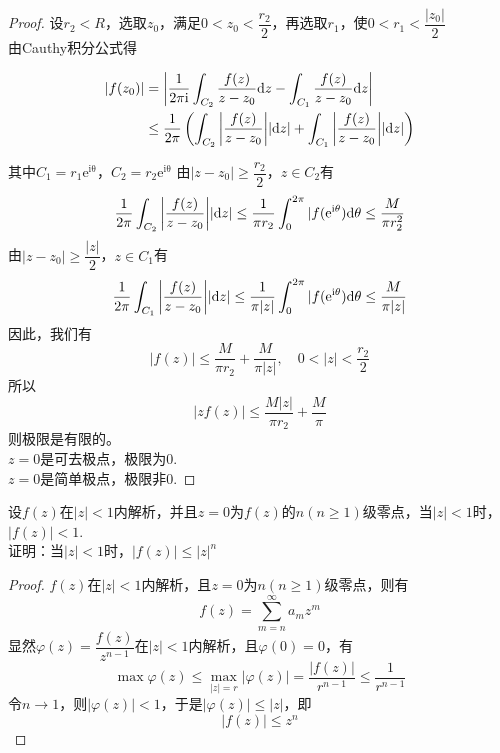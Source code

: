 \begin{proof}
    
    设$r_2 < R$，选取$z_0$，满足$0 < z_0 < \dfrac{r_2}{2}$，再选取$r_1$，使$0 < r_1 < \dfrac{|z_0|}{2}$ \\
    由\textup{Cauthy}积分公式得

    \begin{align*}
        |f(z_0)| & = \left| \dfrac{1}{2\mathrm{\pi i}} \int_{C_2}{\dfrac{f(z)}{z - z_0}}\mathrm{d} z - \int_{C_1}{\dfrac{f(z)}{z - z_0}}\mathrm{d} z \right| \\
        & \leq \dfrac{1}{2 \pi} \left( \int_{C_2}{\left| \dfrac{f(z)}{z - z_0} \right|}|\mathrm{d} z| + \int_{C_1}{\left| \dfrac{f(z)}{z - z_0} \right|}|\mathrm{d} z| \right)
    \end{align*}

    其中$C_1 = r_1\mathrm{e^{i\theta}}$，$C_2 = r_2\mathrm{e^{i\theta}}$
    由$|z - z_0| \geq \dfrac{r_2}{2}$，$z \in C_2$有
    $$ \dfrac{1}{2 \pi} \int_{C_2}{\left| \dfrac{f(z)}{z - z_0} \right|}|\mathrm{d} z| \leq \dfrac{1}{ \pi r_2}\int_{0}^{2 \pi}{|f(\mathrm{e}^{\mathrm{i}\theta})}\mathrm{d} \theta \leq \dfrac{M}{ \pi r_2^2}$$
    由$|z - z_0| \geq \dfrac{|z|}{2}$，$z \in C_1$有
    $$ \dfrac{1}{2 \pi} \int_{C_1}{\left| \dfrac{f(z)}{z - z_0} \right|}|\mathrm{d} z| \leq \dfrac{1}{ \pi|z|}\int_{0}^{2 \pi}{|f(\mathrm{e}^{\mathrm{i}\theta})}\mathrm{d} \theta \leq \dfrac{M}{ \pi|z|}$$
    因此，我们有
    $$|f(z)| \leq \dfrac{M}{ \pi r_2} + \dfrac{M}{ \pi|z|}, \quad 0 < |z| < \dfrac{r_2}{2}$$
    所以$$|zf(z)| \leq \dfrac{M|z|}{ \pi r_2} + \dfrac{M}{\pi}$$
    则极限是有限的。\\
    $z = 0$是可去极点，极限为$0$. \\
    $z = 0$是简单极点，极限非$0$.

\end{proof}

\begin{proposition}

    设$f(z)$在$|z| < 1 $内解析，并且$z = 0$为$f(z)$的$n(n \geq 1)$级零点，当$|z| < 1$时，$|f(z)| < 1$. \\
    证明：当$|z| < 1$时，$|f(z)| \leq |z|^n$

\end{proposition}

\begin{proof}
    
    $f(z)$在$|z| < 1$内解析，且$z = 0$为$n(n \geq 1)$级零点，则有
    $$f(z) = \sum\limits_{m = n}^{\infty}{a_mz^m}$$
    显然$\varphi(z) = \dfrac{f(z)}{z^{n - 1}}$在$|z| < 1$内解析，且$\varphi(0) = 0$，有
    $$ \max\varphi(z) \leq \max_{|z| = r}|\varphi(z)| = \dfrac{|f(z)|}{r^{n - 1}} \leq \dfrac{1}{r^{n - 1}} $$
    令$n \to 1$，则$|\varphi(z)| < 1$，于是$|\varphi(z)| \leq |z|$，即
    $$|f(z)| \leq z^n$$

\end{proof}


